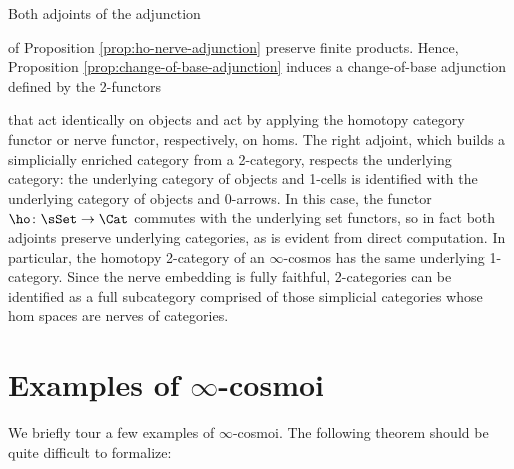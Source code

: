 \begin{example}\label{ex:nerve-ho-change-of-base}
Both adjoints of the adjunction
\begin{center}
\end{center} of Proposition \ref{prop:ho-nerve-adjunction} preserve finite products. Hence, Proposition \ref{prop:change-of-base-adjunction} induces a change-of-base adjunction defined by the 2-functors
\begin{center}
\end{center}
that act identically on objects and act by applying the homotopy category functor or nerve functor, respectively, on homs. %
  The right adjoint, which builds a simplicially enriched category from a 2-category, respects the underlying category: the underlying category of objects and 1-cells is identified with the underlying category of objects and 0-arrows. In this case, the functor $\ho \colon \sSet \to \Cat$ commutes with the underlying set functors, so in fact both adjoints preserve underlying categories, as is evident from direct computation. In particular, the homotopy 2-category of an $\infty$-cosmos has the same underlying 1-category. Since the nerve embedding is fully faithful, 2-categories can be identified as a full subcategory comprised of those simplicial categories whose hom spaces are nerves of categories.
\end{example}

\section{Examples of \texorpdfstring{$\infty$}{infinity}-cosmoi}\label{sec:examples}

We briefly tour a few examples of $\infty$-cosmoi. %
The following theorem should be quite difficult to formalize:

